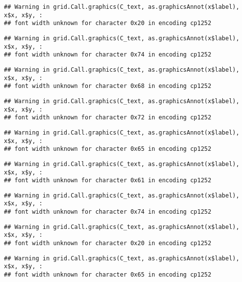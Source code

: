 \documentclass[
]{article}
\begin{document}
\begin{verbatim}
## Warning in grid.Call.graphics(C_text, as.graphicsAnnot(x$label), x$x, x$y, :
## font width unknown for character 0x20 in encoding cp1252
\end{verbatim}

\begin{verbatim}
## Warning in grid.Call.graphics(C_text, as.graphicsAnnot(x$label), x$x, x$y, :
## font width unknown for character 0x74 in encoding cp1252
\end{verbatim}

\begin{verbatim}
## Warning in grid.Call.graphics(C_text, as.graphicsAnnot(x$label), x$x, x$y, :
## font width unknown for character 0x68 in encoding cp1252
\end{verbatim}

\begin{verbatim}
## Warning in grid.Call.graphics(C_text, as.graphicsAnnot(x$label), x$x, x$y, :
## font width unknown for character 0x72 in encoding cp1252
\end{verbatim}

\begin{verbatim}
## Warning in grid.Call.graphics(C_text, as.graphicsAnnot(x$label), x$x, x$y, :
## font width unknown for character 0x65 in encoding cp1252
\end{verbatim}

\begin{verbatim}
## Warning in grid.Call.graphics(C_text, as.graphicsAnnot(x$label), x$x, x$y, :
## font width unknown for character 0x61 in encoding cp1252
\end{verbatim}

\begin{verbatim}
## Warning in grid.Call.graphics(C_text, as.graphicsAnnot(x$label), x$x, x$y, :
## font width unknown for character 0x74 in encoding cp1252
\end{verbatim}

\begin{verbatim}
## Warning in grid.Call.graphics(C_text, as.graphicsAnnot(x$label), x$x, x$y, :
## font width unknown for character 0x20 in encoding cp1252
\end{verbatim}

\begin{verbatim}
## Warning in grid.Call.graphics(C_text, as.graphicsAnnot(x$label), x$x, x$y, :
## font width unknown for character 0x65 in encoding cp1252
\end{verbatim}
\end{document}
